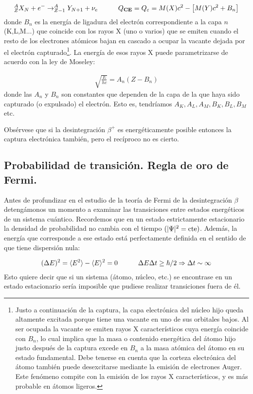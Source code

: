 \begin{equation}
	^A_ZX_N + e^- \rightarrow ^A_{Z-1} Y_{N+1} + \nu_e \quad \quad \quad Q_{\textbf{CE}} = Q_\varepsilon = M(X) c^2 - \left[ M(Y)c^2+ B_n \right]
\end{equation}
donde $B_n$ es la energía de ligadura del electrón correspondiente a la capa $n$ (K,L,M...) que coincide con los rayos X (uno o varios) que se emiten cuando el resto de los electrones atómicos bajan en cascado a ocupar la vacante dejada por el electrón capturado\footnote{Justo a continuación de la captura, la capa electrónica del núcleo hijo queda altamente excitada porque tiene una vacante en uno de sus orbitales bajos. Al ser ocupada la vacante se emiten rayos X característicos cuya energía coincide con $B_n$, lo cual implica que la masa o contenido energética del átomo hijo justo después de la captura excede en $B_n$ a la masa atómica del átomo en su estado fundamental. Debe tenerse en cuenta que la corteza electrónica del átomo también puede desexcitarse mediante la emisión de electrones Auger. Este fenómeno compite con la emisión de los rayos X característicos, y es más probable en átomos ligeros.}. La energía de esos rayos X puede parametrizarse de acuerdo con la ley de Moseley:

\begin{eqnarray}
	\sqrt{\frac{E}{hc}} = A_n (Z-B_n)
\end{eqnarray}	
donde las $A_n$ y $B_n$ son constantes que dependen de la capa de la que haya sido capturado (o expulsado) el electrón. Esto es, tendríamos $A_K,A_L,A_M,B_K,B_L,B_M$ etc.

Obsérvese que si la desintegración $\beta^+$ es energéticamente posible entonces la captura electrónica también, pero el recíproco no es cierto. 

\subsection{Probabilidad de transición. Regla de oro de Fermi.}

Antes de profundizar en el estudio de la teoría de Fermi de la desintegración $\beta$ detengámonos un momento a examinar las transiciones entre estados energéticos de un sistema cuántico. Recordemos que en un estado estrictamente estacionario la densidad de probabilidad no cambia con el tiempo $(|\Psi|^2 = \text{cte})$. Además, la energía que corresponde a ese estado está perfectamente definida en el sentido de que tiene dispersión nula:

\begin{eqnarray}
	(\Delta E)^2 = \langle E^2 \rangle - \langle E \rangle^2 = 0 \quad \quad \quad \Delta E \Delta t \geq \hbar / 2 \Rightarrow \Delta t \sim \infty
\end{eqnarray}
Esto quiere decir que si un sistema (átomo, núcleo, etc.) se encontrase en un estado estacionario sería imposible que pudiese realizar transiciones fuera de él. 

